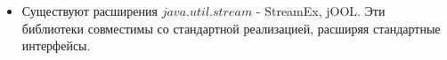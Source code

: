 \begin{frame}
\frametitle{\insertsection} 
\framesubtitle{\insertsubsection}
\begin{itemize}
	
	\item Существуют расширения $java.util.stream$ - StreamEx, jOOL. Эти библиотеки совместимы со стандартной реализацией, расширяя стандартные интерфейсы.
\end{itemize}
\end{frame}
